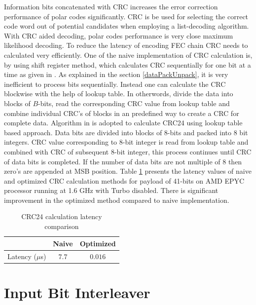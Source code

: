 Information bits concatenated with CRC increases the error correction performance of polar codes significantly. CRC is be used for selecting the correct code word out of potential candidates when employing a list-decoding algorithm. With CRC aided decoding, polar codes performance is very close maximum likelihood decoding. To reduce the latency of encoding FEC chain CRC needs to calculated very efficiently. One of the naive implementation of CRC calculation is, by using shift register method, which calculates CRC sequentially for one bit at a time as given in \cite{naiveCRCCalculation}. As explained in the section \ref{dataPackUnpack}, it is very inefficient to process bits sequentially. Instead one can calculate the CRC blockwise with the help of lookup table. In otherwords, divide the data into blocks of $B$-bits, read the corresponding CRC value from lookup table and combine individual CRC's of blocks in an predefined way to create a CRC for complete data. Algorithm in \cite{Sarwate:1988:CCR:63030.63037} is adopted to calculate CRC24 using lookup table based approach. Data bits are divided into blocks of 8-bits and packed into 8 bit integers. CRC value corresponding to 8-bit integer is read from lookup table and combined with CRC of subsequent 8-bit integer, this process continues until CRC of data bits is completed. If the number of data bits are not multiple of 8 then zero's are appended at MSB position.  Table \ref{tab:crcLatencyTable} presents the latency values of naive and optimized  CRC calculation methods for payload of 41-bits on AMD EPYC processor running at 1.6 GHz with Turbo disabled. There is significant improvement in the optimized method compared to naive implementation.

\begin{table}[h!]
	\begin{center}
		\caption{CRC24 calculation latency comparison}
		\label{tab:crcLatencyTable}
		\begin{tabular}{c|c|c} %
			\textbf{ } & Naive & Optimized \\
			\hline
			Latency ($\mu$s) & $7.7$ & $0.016$\\
		\end{tabular}
	\end{center}
\end{table}

\section{Input Bit Interleaver}


